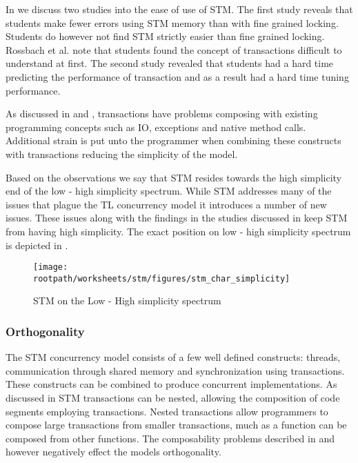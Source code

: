 In  we discuss two studies into the ease of use of \ac{STM}. The first study reveals that students make fewer errors using \ac{STM} memory than with fine grained locking. Students do however not find \ac{STM} strictly easier than fine grained locking. Rossbach et al. note that students found the concept of transactions difficult to understand at first. The second study revealed that students had a hard time predicting the performance of transaction and as a result had a hard time tuning performance.

As discussed in  and , transactions have problems composing with existing programming concepts such as \ac{IO}, exceptions and native method calls. Additional strain is put unto the programmer when combining these constructs with transactions reducing the simplicity of the  model.

Based on the observations we say that \ac{STM} resides towards the high simplicity end of the low - high simplicity spectrum. While \ac{STM} addresses many of the issues that plague the \ac{TL} concurrency model it introduces a number of new issues. These issues along with the findings in the studies discussed in  keep \ac{STM} from having high simplicity. The exact position on low - high simplicity spectrum is depicted in .

\begin{figure}[htbp]
\centering
 \texttt{[image: \\rootpath/worksheets/stm/figures/stm\_char\_simplicity]} 
 \caption{\ac{STM} on the Low - High simplicity spectrum}
\label{fig:stm_char_simplicity}
\end{figure}

\subsubsection{Orthogonality}\label{sec:stm_orthogonality}
\label{subsec:stm_orthogonality}
The \ac{STM} concurrency model consists of a few well defined constructs: threads, communication through shared memory and synchronization using transactions. These constructs can be combined to produce concurrent implementations. As discussed in  \ac{STM} transactions can be nested, allowing the composition of code segments employing transactions. Nested transactions allow programmers to compose large transactions from smaller transactions, much as a function can be composed from other functions. The composability problems described in  and  however negatively effect the models orthogonality.

